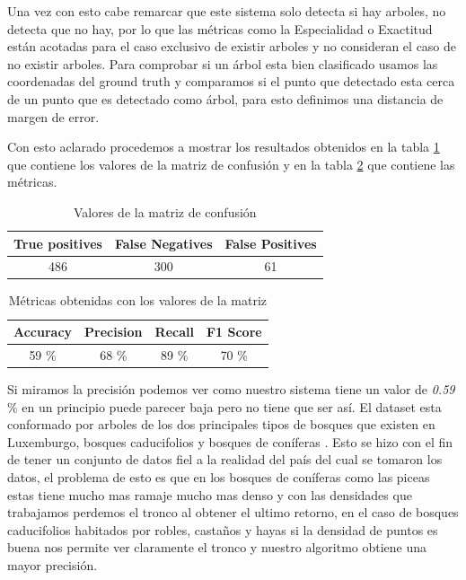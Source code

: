 Una vez con esto cabe remarcar que este sistema solo detecta si hay arboles, no detecta que no hay, por lo que las métricas como la Especialidad o Exactitud están acotadas para el caso exclusivo de existir arboles y no consideran el caso de no existir arboles.
Para comprobar si un árbol esta bien clasificado usamos las coordenadas del ground truth y comparamos si el punto que detectado esta cerca de un punto que es detectado como árbol, para esto definimos una distancia de margen de error.

Con esto aclarado procedemos a mostrar los resultados obtenidos en la tabla \ref{tablaconf} que contiene los valores de la matriz de confusión y en la tabla \ref{tablaMetr} que contiene las métricas.
\begin{table}[h]
\centering
{}
\begin{tabular}{c|c|c}
\rowcolor{udcpink!25}
\textbf{True positives} & \textbf{False Negatives} & \textbf{False Positives} \\\hline
486 & 300 & 61 \\
\end{tabular}
\caption{Valores de la matriz de confusión}
\label{tablaconf}
\end{table}

\begin{table}[h]
\centering
{}
\begin{tabular}{c|c|c|c}
\rowcolor{udcpink!25}
\textbf{Accuracy} & \textbf{Precision} & \textbf{Recall} & \textbf{F1 Score} \\\hline
59 \% & 68 \% & 89 \% & 70 \% \\
\end{tabular}
\caption{Métricas obtenidas con los valores de la matriz}
\label{tablaMetr}
\end{table}

Si miramos la precisión podemos ver como nuestro sistema tiene un valor de \textit{0.59} \% en un principio puede parecer baja pero no tiene que ser así. El dataset esta conformado por arboles de los dos principales tipos de bosques que existen en Luxemburgo, bosques caducifolios y bosques de coníferas \cite{luxfores}. Esto se hizo con el fin de tener un conjunto de datos fiel a la realidad del país del cual se tomaron los datos, el problema de esto es que en los bosques de coníferas como las piceas estas tiene mucho mas ramaje mucho mas denso y con las densidades que trabajamos perdemos el tronco al obtener el ultimo retorno, en el caso de bosques caducifolios habitados por robles, castaños y hayas si la densidad de puntos es buena nos permite ver claramente el tronco y nuestro algoritmo obtiene una mayor precisión. 


